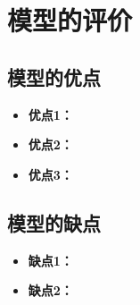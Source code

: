%
\section{模型的评价}

\subsection{模型的优点}
\begin{itemize}[itemindent=2em]
\item \textbf{优点1：}
\item \textbf{优点2：}
\item \textbf{优点3：}
\end{itemize}

\subsection{模型的缺点}
\begin{itemize}[itemindent=2em]
\item \textbf{缺点1：}
\item \textbf{缺点2：}
\end{itemize}
